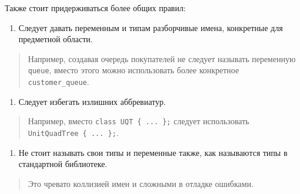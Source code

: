 Также стоит придерживаться более общих правил:

\begin{enumerate}
\def\labelenumi{\arabic{enumi})}
\tightlist
\item
  Следует давать переменным и типам разборчивые имена, конкретные для
  предметной области.
\end{enumerate}

\begin{quote}
Например, создавая очередь покупателей не следует называть переменную
\texttt{queue}, вместо этого можно использовать более конкретное
\texttt{customer\_queue}.
\end{quote}

\begin{enumerate}
\def\labelenumi{\arabic{enumi})}
\setcounter{enumi}{1}
\tightlist
\item
  Следует избегать излишних аббревиатур.
\end{enumerate}

\begin{quote}
Например, вместо \texttt{class\ UQT\ \{\ ...\ \};} следует использовать
\texttt{UnitQuadTree\ \{\ ...\ \};}.
\end{quote}

\begin{enumerate}
\def\labelenumi{\arabic{enumi})}
\setcounter{enumi}{2}
\tightlist
\item
  Не стоит называть свои типы и переменные также, как называются типы в
  стандартной библиотеке.
\end{enumerate}

\begin{quote}
Это чревато коллизией имен и сложными в отладке ошибками.
\end{quote}
